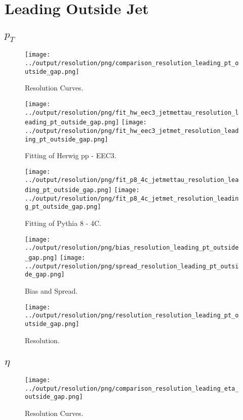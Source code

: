 \documentclass[11pt]{book}
\begin{document}
\chapter{Leading Outside Jet}
\section{$p_{T}$}

\begin{figure}[ht]
\centering
\texttt{[image: ../output/resolution/png/comparison\_resolution\_leading\_pt\_outside\_gap.png]}
\caption{Resolution Curves.}
\end{figure}


\begin{figure}[ht]
\centering
\texttt{[image: ../output/resolution/png/fit\_hw\_eec3\_jetmettau\_resolution\_leading\_pt\_outside\_gap.png]}
\texttt{[image: ../output/resolution/png/fit\_hw\_eec3\_jetmet\_resolution\_leading\_pt\_outside\_gap.png]}
\caption{Fitting of Herwig pp - EEC3.}
\end{figure}

\begin{figure}[ht]
\centering
\texttt{[image: ../output/resolution/png/fit\_p8\_4c\_jetmettau\_resolution\_leading\_pt\_outside\_gap.png]}
\texttt{[image: ../output/resolution/png/fit\_p8\_4c\_jetmet\_resolution\_leading\_pt\_outside\_gap.png]}
\caption{Fitting of Pythia 8 - 4C.}
\end{figure}

\begin{figure}[ht]
\centering
\texttt{[image: ../output/resolution/png/bias\_resolution\_leading\_pt\_outside\_gap.png]}
\texttt{[image: ../output/resolution/png/spread\_resolution\_leading\_pt\_outside\_gap.png]}
\caption{Bias and Spread.}
\end{figure}


\begin{figure}[ht]
\centering
\texttt{[image: ../output/resolution/png/resolution\_resolution\_leading\_pt\_outside\_gap.png]}
\caption{Resolution.}
\end{figure}
\clearpage

\section{$\eta$}

\begin{figure}[ht]
\centering
\texttt{[image: ../output/resolution/png/comparison\_resolution\_leading\_eta\_outside\_gap.png]}
\caption{Resolution Curves.}
\end{figure}
\end{document}
